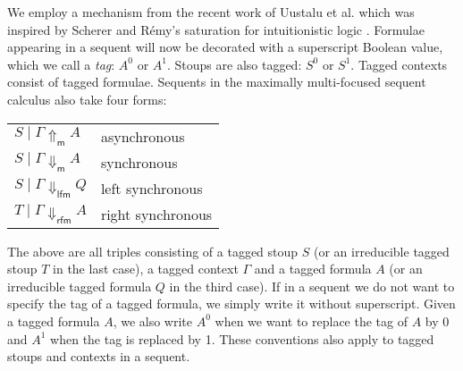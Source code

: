 \documentclass[runningheads]{llncs}
\newcommand{\lfm}{\dn_\mathsf{lfm}}%
\newcommand{\rfm}{\dn_\mathsf{rfm}}%
\newcommand{\dn}{\Downarrow}
\newcommand{\upm}{\Uparrow_{\mathsf{m}}}
\newcommand{\dnm}{\Downarrow_{\mathsf{m}}}
\begin{document}
We employ a mechanism from the recent work of Uustalu et al. \cite{UVW:protsn} which was inspired by Scherer and R{\'e}my's saturation for intuitionistic logic \cite{scherer:simple:2015}. Formulae appearing in a sequent will now be decorated with a superscript Boolean value, which we call a \emph{tag}: $A^0$ or $A^1$. 
Stoups are also tagged: $S^0$ or $S^1$. Tagged contexts consist of tagged formulae. Sequents in the maximally multi-focused sequent calculus also take four forms:
\begin{center}
  \begin{tabular}{|@{\;}l@{\qquad}l@{\;}|}
    \hline
    $S \mid \Gamma \upm A$ & asynchronous\\
    $S \mid \Gamma \dnm A$ & synchronous \\
    $S \mid \Gamma \lfm Q$ & left synchronous \\
    $T \mid \Gamma \rfm A$ & right synchronous \\
 \hline
\end{tabular}
    \end{center}
The above are all triples consisting of a tagged stoup $S$ (or an irreducible tagged stoup $T$ in the last case), a tagged context $\Gamma$ and a tagged formula $A$ (or an irreducible tagged formula $Q$ in the third case). If in a sequent we do not want to specify the tag of a tagged formula, we simply write it without superscript. Given a tagged formula $A$, we also write $A^0$ when we want to replace the tag of $A$ by $0$ and $A^1$ when the tag is replaced by 1. These conventions also apply to tagged stoups and contexts in a sequent.
\end{document}
